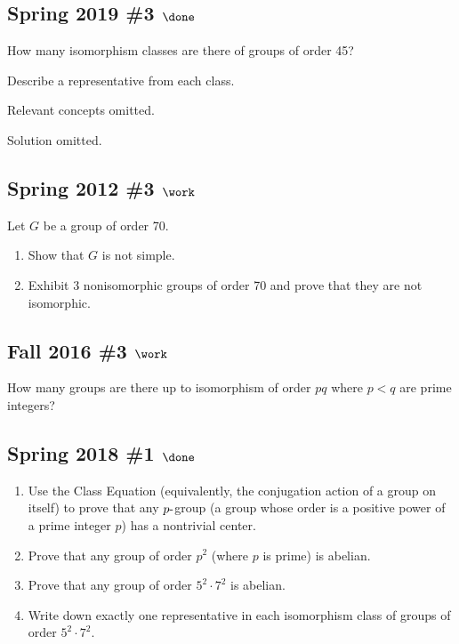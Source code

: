 \hypertarget{spring-2019-3-done}{%
\subsection{\texorpdfstring{Spring 2019 \#3
\(\done\)}{Spring 2019 \#3 \textbackslash done}}\label{spring-2019-3-done}}

How many isomorphism classes are there of groups of order 45?

Describe a representative from each class.

Relevant concepts omitted.

Solution omitted.


\hypertarget{spring-2012-3-work}{%
\subsection{\texorpdfstring{Spring 2012 \#3
\(\work\)}{Spring 2012 \#3 \textbackslash work}}\label{spring-2012-3-work}}

Let \(G\) be a group of order 70.

\begin{enumerate}
\def\labelenumi{\alph{enumi}.}
\item
  Show that \(G\) is not simple.
\item
  Exhibit 3 nonisomorphic groups of order 70 and prove that they are not
  isomorphic.
\end{enumerate}

\hypertarget{fall-2016-3-work}{%
\subsection{\texorpdfstring{Fall 2016 \#3
\(\work\)}{Fall 2016 \#3 \textbackslash work}}\label{fall-2016-3-work}}

How many groups are there up to isomorphism of order \(pq\) where
\(p<q\) are prime integers?

\hypertarget{spring-2018-1-done}{%
\subsection{\texorpdfstring{Spring 2018 \#1
\(\done\)}{Spring 2018 \#1 \textbackslash done}}\label{spring-2018-1-done}}

\begin{enumerate}
\def\labelenumi{\alph{enumi}.}
\item
  Use the Class Equation (equivalently, the conjugation action of a
  group on itself) to prove that any \(p{\hbox{-}}\)group (a group whose
  order is a positive power of a prime integer \(p\)) has a nontrivial
  center.
\item
  Prove that any group of order \(p^2\) (where \(p\) is prime) is
  abelian.
\item
  Prove that any group of order \(5^2 \cdot 7^2\) is abelian.
\item
  Write down exactly one representative in each isomorphism class of
  groups of order \(5^2 \cdot 7^2\).
\end{enumerate}

